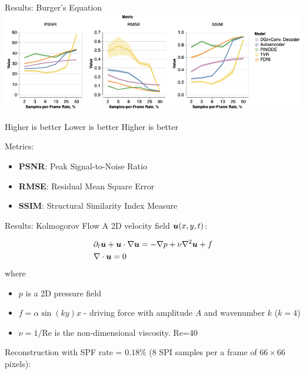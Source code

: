 \documentclass[8pt]{beamer}
\begin{document}
\begin{frame}{Results: Burger's Equation}
	\includegraphics[width=\textwidth]{Figures/cs_burgers_psnr.png}
	
	\vspace{1em}
	
	\hspace{2em} Higher is better \hspace{2.6em} Lower is better \hspace{2.6em} Higher is better
	
	\vspace{1em}
	Metrics:
	\begin{itemize}
		\item \textbf{PSNR}: Peak Signal-to-Noise Ratio 
		\item \textbf{RMSE}: Residual Mean Square Error
		\item \textbf{SSIM}: Structural Similarity Index Measure
	\end{itemize}
\end{frame}

\begin{frame}{Results: Kolmogorov Flow}
	A 2D velocity field $\boldsymbol{u}(x, y, t)$:

	\begin{align}
	& \partial_t \boldsymbol{u} + \boldsymbol{u} \cdot \nabla \boldsymbol{u} = -\nabla p + \nu\nabla^2\boldsymbol{u} + f \\
	& \nabla \cdot \boldsymbol{u} = 0
	\end{align}
	where 
	\begin{itemize}
		\item $p$ is a 2D pressure field
		\item $f = \alpha\sin(ky)x$ - driving force with amplitude $A$ and wavenumber $k$ ($k=4$)
		\item $\nu = 1/\text{Re}$ is the non-dimensional viscosity. Re=40
	\end{itemize}
	\vspace{1em}
	Reconstruction with SPF rate = $0.18$\% (8 SPI samples per a frame of $66\times 66$ pixels):  
\end{frame}
\end{document}
